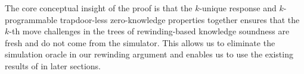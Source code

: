The core conceptual insight of the proof is that the $k$-unique response  and $k$-programmable trapdoor-less zero-knowledge properties together ensures that the $k$-th move challenges in the trees of rewinding-based knowledge soundness are fresh and do not come from the simulator. This allows us to eliminate the simulation oracle in our rewinding argument and enables us to use the existing results of \cite{EPRINT:AttFehKlo21} in later sections.



%



